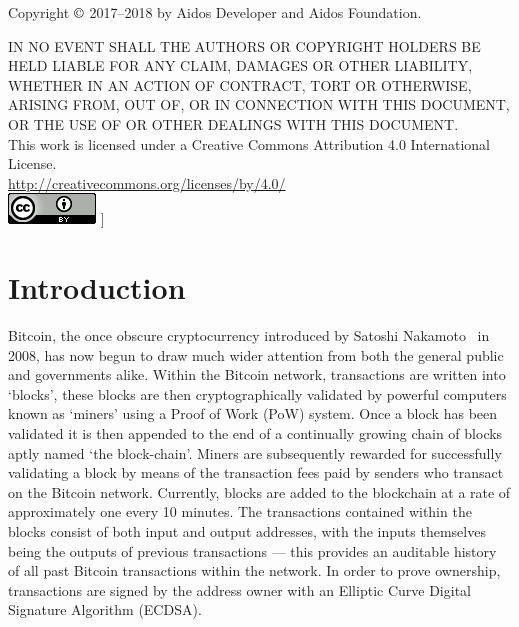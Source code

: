 \documentclass[a4paper,10pt,twocolumn]{article}
\begin{document}
Copyright \( \copyright \)  2017--2018 by Aidos Developer and Aidos Foundation.

IN NO EVENT SHALL THE AUTHORS OR COPYRIGHT HOLDERS BE HELD LIABLE FOR ANY CLAIM, DAMAGES OR OTHER
LIABILITY, WHETHER IN AN ACTION OF CONTRACT, TORT OR OTHERWISE, ARISING FROM,
OUT OF, OR IN CONNECTION WITH THIS DOCUMENT, OR THE USE OF OR OTHER DEALINGS WITH
THIS DOCUMENT\@.\\

This work is licensed under a Creative Commons Attribution 4.0 International License. \\
\url{http://creativecommons.org/licenses/by/4.0/} \\
\includegraphics{cc}
]

\twocolumn[
\tableofcontents
]

\clearpage

\section{Introduction}
Bitcoin, the once obscure cryptocurrency introduced by Satoshi Nakamoto~\cite{btc} in 2008, has now begun to draw much wider attention 
from both the general public and governments alike. Within the Bitcoin network, transactions are written into `blocks', these blocks 
are then cryptographically validated by powerful computers known as `miners' using a Proof of Work (PoW) system. Once a block has been 
validated it is then appended to the end of a continually growing chain of blocks aptly named `the block-chain'. Miners are 
subsequently rewarded for successfully validating a block by means of the transaction fees paid by senders who transact on the Bitcoin 
network.
Currently, blocks are added to the blockchain at a rate of approximately one every 10 minutes. The transactions contained within the
blocks consist of both input and output addresses, with the inputs themselves being the outputs of previous transactions --- this 
provides an auditable history of all past Bitcoin transactions within the network. In order to prove ownership, transactions are signed 
by the address owner with an Elliptic Curve Digital Signature Algorithm (ECDSA).
\end{document}

